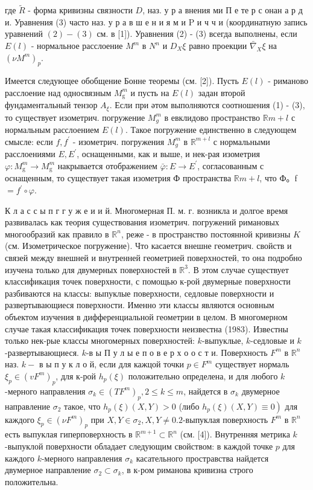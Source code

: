 \documentclass[10pt]{article}
\begin{document}
где $\tilde{R}$ - форма кривизны связности $D$, наз. у р а внения ми П е те р с онан а р д и. Уравнения (3) часто наз. у р а в ш е н и я м и $\mathrm{P}$ и ч ч и (координатную запись уравнений $(2)-(3)$ см. в [1]). Уравнения (2) - (3) всегда выполнены, если $E(l)$ - нормальное расслоение $M^{m}$ в $N^{n}$ и $D_{X} \xi$ равно проекции $\bar{\nabla}_{X} \xi$ на $\left(\nu M^{m}\right)_{p}$.



Имеется следующее обобщение Бонне теоремы (см. [2]). Пусть $E(l)$ - риманово расслоение над односвязным $M_{\mathrm{g}}^{m}$ и пусть на $E(l)$ задан второй фундаментальный тензор $A_{\xi}$. Если при әтом выполняются соотношения (1) - (3), то существует изометрич. погружение $M_{g}^{m}$ в евклидово пространство $\mathbb{R} m+l$ с нормальным расслоением $E(l)$. Такое погружение единственно в следующем смысле: если $f, f^{\prime}$ - изометрич. погружения $M_{g}^{m}$ в $\mathbb{R}^{m+l}$ с нормальными расслоениями $E, E^{\prime}$, оснащенными, как и выше, и нек-рая изометрия $\varphi: M_{\mathrm{g}}^{m} \rightarrow M_{\mathrm{g}}^{m}$ накрывается отображением $\bar{\varphi}: E \rightarrow E^{\prime}$, согласованным с оснащенным, то существует такая изометрия Ф пространства $\mathbb{R} m+l$, что Ф。f $=f^{\prime} \circ \varphi$.



К л а с с ы п г г у ж е и и й. Многомерная П. м. г. возникла и долгое время развивалась как теория существования изометрич. погружений римановых многообразий как правило в $\mathbb{R}^{n}$, реже - в пространство постоянной кривизны $K$ (см. Изометрическое погружение). Что касается внешне геометрич. свойств и связей между внешней и внутренней геометрией поверхностей, то она подробно изучена только для двумерных поверхностей в $\mathbb{R}^{3}$. В этом случае существует классификация точек поверхности, с помощью к-рой двумерные поверхности разбиваются на классы: выпуклые поверхности, седловые поверхности и развертывающиеся поверхности. Именно эти классы являются основным объектом изучения в дифференциальной геометрии в целом. В многомерном случае такая классификация точек поверхности неизвестна (1983). Известны только нек-рые классы многомерных поверхностей: $k$-выпуклые, $k$-седловые и $k$-развертывающиеся. $k$-в ы П у л ы е п о в е р х о о с т и. Поверхность $F^{m}$ в $\mathbb{R}^{n}$ наз. $k-$ в ы п у к л о й, если для кажцой точки $p \in F^{m}$ существует нормаль $\xi_{p} \in\left(v F^{m}\right)_{p}$, для к-рой $h_{p}(\xi)$ положительно определена, и для любого $k$-мерного направления $\sigma_{k} \in\left(T F^{m}\right)_{p}, 2 \leqslant k \leqslant m$, найдется в $\sigma_{k}$ двумерное направление $\sigma_{2}$ такое, что $h_{p}(\xi)(X, Y)>0$ (либо $\left.h_{p}(\xi)(X, Y) \equiv 0\right)$ для каждого $\xi_{p} \in\left(\nu F^{m}\right)_{p}$ при $X, Y \in \sigma_{2}, X, Y \neq 0.2$-выпуклая поверхность $F^{m}$ в $\mathbb{R}^{n}$ есть выпуклая гиперповерхность в $\mathbb{R}^{m+1} \subset \mathbb{R}^{n}$ (см. [4]). Внутренняя метрика $k$-выпуклой поверхности обладает следующим свойством: в каждой точке $p$ для каждого $k$-мерного направления $\sigma_{k}$ касательного простравства найдется двумерное направление $\sigma_{2} \subset \sigma_{k}$, в к-ром риманова кривизна строго положительна.
\end{document}
